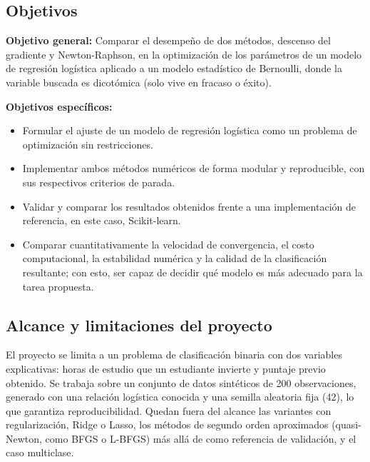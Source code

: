 \subsection{Objetivos}
\textbf{Objetivo general:} Comparar el desempeño de dos métodos, descenso del gradiente y Newton-Raphson, en la optimización de los parámetros de un modelo de regresión logística aplicado a un modelo estadístico de Bernoulli, donde la variable buscada es dicotómica (solo vive en fracaso o éxito).

\textbf{Objetivos específicos:}
\begin{itemize}
    \item Formular el ajuste de un modelo de regresión logística como un problema de optimización sin restricciones.
    \item Implementar ambos métodos numéricos de forma modular y reproducible, con sus respectivos criterios de parada.
    \item Validar y comparar los resultados obtenidos frente a una implementación de referencia, en este caso, Scikit-learn.
    \item Comparar cuantitativamente la velocidad de convergencia, el costo computacional, la estabilidad numérica y la calidad de la clasificación resultante; con esto, ser capaz de decidir qué modelo es más adecuado para la tarea propuesta.
\end{itemize}

\subsection{Alcance y limitaciones del proyecto}
El proyecto se limita a un problema de clasificación binaria con dos variables explicativas: horas de estudio que un estudiante invierte y puntaje previo obtenido. Se trabaja sobre un conjunto de datos sintéticos de 200 observaciones, generado con una relación logística conocida y una semilla aleatoria fija (42), lo que garantiza reproducibilidad. Quedan fuera del alcance las variantes con regularización, Ridge o Lasso, los métodos de segundo orden aproximados (quasi-Newton, como BFGS o L-BFGS) más allá de como referencia de validación, y el caso multiclase.

